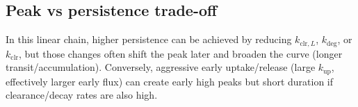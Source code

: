 \subsection*{Peak vs persistence trade-off}

In this linear chain, higher persistence can be achieved by reducing $k_{\mathrm{clr},L}$, $k_{\mathrm{deg}}$, or $k_{\mathrm{clr}}$, but those changes often shift the peak later and broaden the curve (longer transit/accumulation). Conversely, aggressive early uptake/release (large $k_{\mathrm{up}}$, effectively larger early flux) can create early high peaks but short duration if clearance/decay rates are also high.
